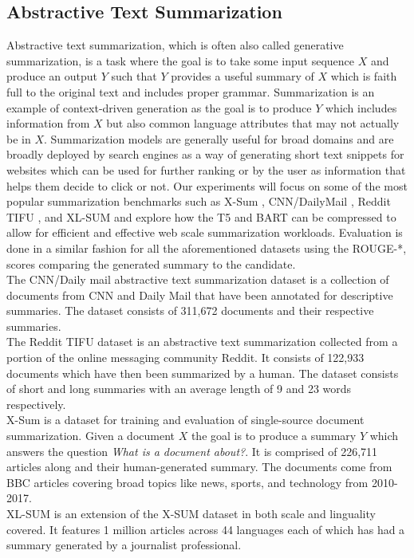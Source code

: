 \subsection{Abstractive Text Summarization}
Abstractive text summarization, which is often also called generative summarization, is a task where the goal is to take some input sequence $X$ and produce an output $Y$ such that $Y$ provides a useful summary of $X$ which is faith full to the original text and includes proper grammar. Summarization is an example of context-driven generation as the goal is to produce $Y$ which includes information from $X$ but also common language attributes that may not actually be in $X$. Summarization models are generally useful for broad domains and are broadly deployed by search engines as a way of generating short text snippets for websites which can be used for further ranking or by the user as information that helps them decide to click or not. Our experiments will focus on some of the most popular summarization benchmarks such as X-Sum \cite{Narayan2018DontGM}, CNN/DailyMail \cite{Nallapati2016AbstractiveTS}, Reddit TIFU \cite{Kim2019AbstractiveSO}, and XL-SUM \cite{Hasan2021XLSumLM} and explore how the T5 \cite{Raffel2020ExploringTL} and  BART \cite{Lewis2020BARTDS} can be compressed to allow for efficient and effective web scale summarization workloads. Evaluation is done in a similar fashion for all the aforementioned datasets using the ROUGE-*, \cite{Lin2004ROUGEAP} scores comparing the generated summary to the candidate.\\
The CNN/Daily mail abstractive text summarization dataset is a collection of documents from CNN and Daily Mail that have been annotated for descriptive summaries. The dataset consists of 311,672 documents and their respective summaries. \\
The Reddit TIFU dataset is an abstractive text summarization collected from a portion of the online messaging community Reddit. It consists of 122,933 documents which have then been summarized by a human. The dataset consists of short and long summaries with an average length of 9 and 23 words respectively. \\
X-Sum is a dataset for training and evaluation of single-source document summarization. Given a document $X$ the goal is to produce a summary $Y$ which answers the question \textit{What is a document about?}. It is comprised of 226,711 articles along and their human-generated summary. The documents come from BBC articles covering broad topics like news, sports, and technology from 2010-2017. \\
XL-SUM is an extension of the X-SUM dataset in both scale and linguality covered. It features 1 million articles across 44 languages each of which has had a summary generated by a journalist professional.
